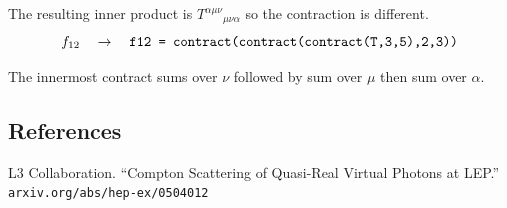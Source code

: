 \documentclass[12pt]{article}
\begin{document}
\noindent
The resulting inner product is $T^{\alpha\mu\nu}{}_{\mu\nu\alpha}$
so the contraction is different.
\begin{equation*}
f_{12}
\quad\rightarrow\quad
\text{\tt f12 = contract(contract(contract(T,3,5),2,3))}
\end{equation*}

\noindent
The innermost contract sums over $\nu$ followed by sum over $\mu$ then sum over $\alpha$.

\subsection*{References}

L3 Collaboration.
``Compton Scattering of Quasi-Real Virtual Photons at LEP.''\\
\verb$arxiv.org/abs/hep-ex/0504012$
\end{document}
